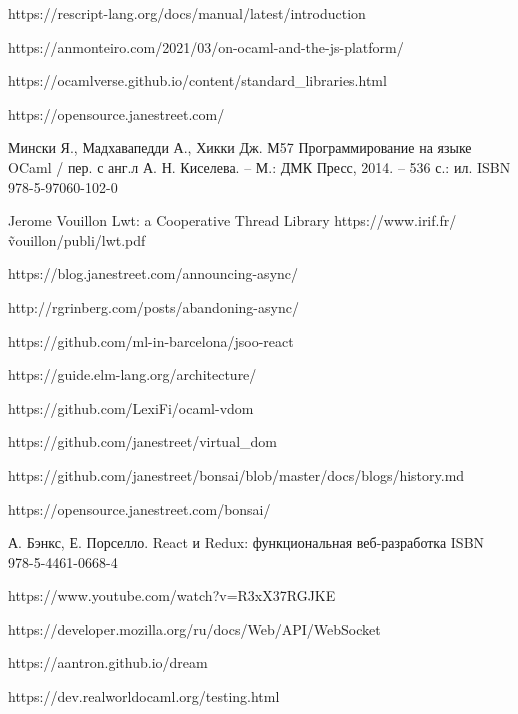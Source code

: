 \begin{thebibliography}{00}
    https://rescript-lang.org/docs/manual/latest/introduction \TODO

    https://anmonteiro.com/2021/03/on-ocaml-and-the-js-platform/ \TODO

    https://ocamlverse.github.io/content/standard\_libraries.html \TODO

    https://opensource.janestreet.com/ \TODO

    Мински Я., Мадхавапедди А., Хикки Дж.
    М57 Программирование на языке OCaml / пер. с анг.л А. Н. Киселева. –
    М.: ДМК Пресс, 2014. – 536 с.: ил.
    ISBN 978-5-97060-102-0
    \TODO

    Jerome Vouillon Lwt: a Cooperative Thread Library \TODO
    https://www.irif.fr/\~vouillon/publi/lwt.pdf

    https://blog.janestreet.com/announcing-async/ \TODO

    http://rgrinberg.com/posts/abandoning-async/ \TODO

    https://github.com/ml-in-barcelona/jsoo-react \TODO

    https://guide.elm-lang.org/architecture/ \TODO

    https://github.com/LexiFi/ocaml-vdom \TODO

    https://github.com/janestreet/virtual\_dom \TODO

    https://github.com/janestreet/bonsai/blob/master/docs/blogs/history.md \TODO

    https://opensource.janestreet.com/bonsai/ \TODO

    А. Бэнкс, Е. Порселло. React и Redux: функциональная веб-разработка ISBN 978-5-4461-0668-4 \TODO

    https://www.youtube.com/watch?v=R3xX37RGJKE \TODO

    https://developer.mozilla.org/ru/docs/Web/API/WebSocket \TODO

    https://aantron.github.io/dream \TODO

    https://dev.realworldocaml.org/testing.html


\end{thebibliography}
